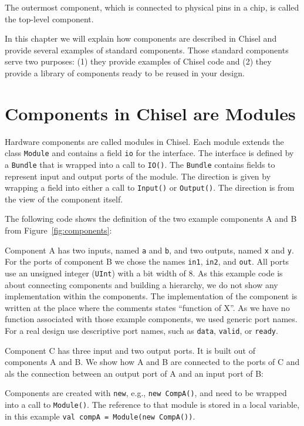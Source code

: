 \documentclass[%
    10pt, %
    headinclude, footexclude,
    openright, %
    notitlepage,
    cleardoubleempty,
    headsepline,
    pointlessnumbers,
    bibtotoc, idxtotoc,
    ]{scrbook}
\newcommand{\code}[1]{{\small{\texttt{#1}}}}
\begin{document}
The outermost component, which is connected to physical pins
in a chip, is called the top-level component.

In this chapter we will explain how components are described in Chisel and
provide several examples of standard components.
Those standard components serve two purposes: (1) they provide examples
of Chisel code and (2) they provide a library of components ready to be reused
in your design.

\section{Components in Chisel are Modules}

Hardware components are called modules in Chisel. Each module extends
the class \code{Module} and contains a field \code{io} for the interface.
The interface is defined by a \code{Bundle} that is wrapped into a call to \code{IO()}.
The \code{Bundle} contains fields to represent input and output ports of
the module. The direction is given by wrapping a field into either a call to \code{Input()}
or \code{Output()}. The direction is from the view of the component itself.

The following code shows the definition of the two example components A and B from
Figure~\ref{fig:components}:



\noindent Component A has two inputs, named \code{a} and \code{b}, and two
outputs, named \code{x} and \code{y}. For the ports of component B
we chose the names \code{in1}, \code{in2}, and \code{out}.
All ports use an unsigned integer (\code{UInt}) with a bit width of 8.
As this example code is about connecting components and building a
hierarchy, we do not show any implementation within the components.
The implementation of the component is written at the place where
the comments states ``function of X''.
As we have no function associated with those example components,
we used generic port names. For a real design use descriptive
port names, such as \code{data}, \code{valid}, or \code{ready}.

Component C has three input and two output ports. It is built out of
components A and B. We show how A and B are connected to the ports
of C and als the connection between an output port of A and an
input port of B:



Components are created with \code{new}, e.g., \code{new CompA()}, and need to be wrapped
into a call to \code{Module()}. The reference to that module is stored in a local variable,
in this example \code{val compA = Module(new CompA())}.
\end{document}
